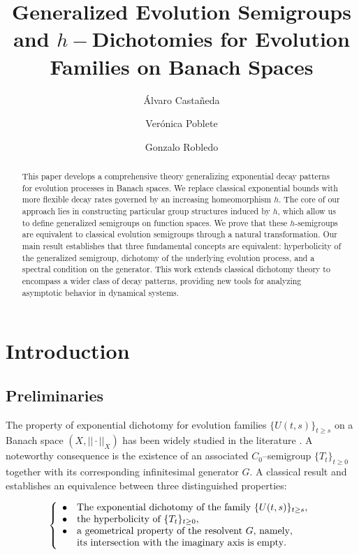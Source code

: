 \documentclass[10pt]{amsart}
\title[]{Generalized Evolution Semigroups and $h-$Dichotomies for Evolution Families on Banach Spaces}
\author[]{\'Alvaro Casta\~neda}
\author[]{Ver\'onica Poblete}
\author[]{Gonzalo Robledo}
\numberwithin{equation}{section}
\begin{document}
\begin{abstract}
    This paper develops a comprehensive theory generalizing exponential decay patterns for evolution processes in Banach spaces. We replace classical exponential bounds with more flexible decay rates governed by an increasing homeomorphism $h$. The core of our approach lies in constructing particular group structures induced by $h$, which allow us to define generalized semigroups on function spaces. We prove that these $h$-semigroups are equivalent to classical evolution semigroups through a natural transformation. Our main result establishes that three fundamental concepts are equivalent: hyperbolicity of the generalized semigroup, dichotomy of the underlying evolution process, and a spectral condition on the generator. This work extends classical dichotomy theory to encompass a wider class of decay patterns, providing new tools for analyzing asymptotic behavior in dynamical systems.
\end{abstract}

\maketitle

\section{Introduction}

\subsection{Preliminaries} The property of exponential dichotomy  
for evolution families $\{U(t,s)\}_{t\geq s}$ on a Banach space $(X,||\cdot||_{X})$ has been widely studied in the literature \cite{Henry-0,Henry,LRS,LM, Pazy,  VQP, SS}. A noteworthy consequence is the existence of an associated $C_{0}$--semigroup $\{T_{t}\}_{t\geq 0}$ together with its corresponding infinitesimal generator $G$. A classical result \cite[Th. 3.17 and Th. 4.25]{CL} and \cite[Th. VI.9.18]{EN} establishes an equivalence
between three distinguished properties:

\begin{equation}
\label{EQ}
\left\{\begin{array}{ll}
\bullet & \textnormal{The exponential dichotomy of the family $\{U(t,s)\}_{t\geq s}$},\\ 
\bullet & \textnormal{the hyperbolicity of $\{T_{t}\}_{t\geq 0}$},\\
\bullet & \textnormal{a geometrical property of the resolvent $G$, namely},\\
& \textnormal{its intersection with the imaginary axis is empty}.
\end{array}\right.
\end{equation}
\end{document}
